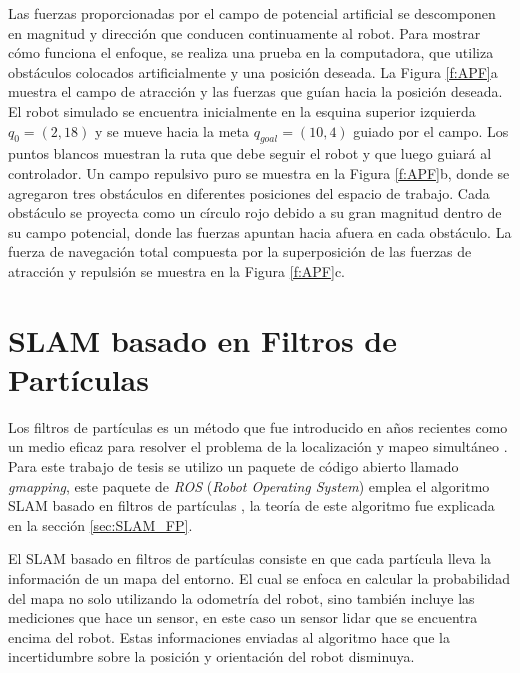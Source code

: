 Las fuerzas proporcionadas por el campo de potencial artificial se descomponen en 
magnitud y dirección que conducen continuamente al robot. Para mostrar cómo funciona el 
enfoque, se realiza una prueba en la computadora, que utiliza obstáculos 
colocados artificialmente y una posición deseada. La Figura \ref{f:APF}a muestra el campo 
de atracción y las fuerzas que guían hacia la posición deseada. El robot simulado se 
encuentra inicialmente en la esquina superior izquierda $q_{0} = (2,18)$ y se mueve hacia 
la meta $q_{goal} = (10,4)$ guiado por el campo. Los puntos blancos muestran la ruta que debe 
seguir el robot y que luego guiará al controlador. Un campo repulsivo puro se muestra en 
la Figura \ref{f:APF}b, donde se agregaron tres obstáculos en diferentes posiciones del espacio de 
trabajo. Cada obstáculo se proyecta como un círculo rojo debido a su gran magnitud dentro de 
su campo potencial, donde las fuerzas apuntan hacia afuera en cada obstáculo. La fuerza de 
navegación total compuesta por la superposición de las fuerzas de atracción y repulsión se 
muestra en la Figura \ref{f:APF}c.

\section{SLAM basado en Filtros de Part\'iculas}
\label{sec:GMAPPING}
Los filtros de partículas es un método que fue introducido en años recientes como un medio 
eficaz para resolver el problema de la localización y mapeo simultáneo 
\cite{nummiaro2003adaptive}. Para este trabajo de tesis se utilizo un paquete de código 
abierto llamado \textit{gmapping}, este paquete de \textit{ROS} (\textit{Robot Operating System}) 
emplea el algoritmo SLAM basado en filtros de partículas \cite{grisetti2007improved}, la teoría
de este algoritmo fue explicada en la sección \ref{sec:SLAM_FP}.

El SLAM basado en filtros de partículas consiste en que cada partícula lleva la información de 
un mapa del entorno. El cual se enfoca en calcular la probabilidad del mapa no solo utilizando 
la odometría del robot, sino también incluye las mediciones que hace un sensor, en este caso un 
sensor lidar que se encuentra encima del robot. Estas informaciones enviadas al algoritmo hace 
que la incertidumbre sobre la posición y orientación del robot disminuya. 

